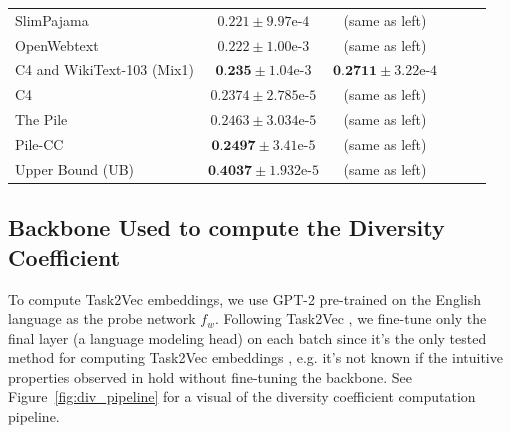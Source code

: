 \begin{table}[t]
\begin{center}
\begin{small}
\begin{sc}
\begin{tabular}{lccccr}
SlimPajama & $0.221 \pm 9.97\textrm{e-}4$ & (same as left) \\ %
OpenWebtext & $ 0.222 \pm  1.00\textrm{e-}3 $ & (same as left) \\ %

C4 and WikiText-103 (Mix1) & $ \textbf{0.235} \pm  1.04$\textrm{e-}3 & $\textbf{0.2711} \pm 3.22\textrm{e-}4$\\ %
C4 & $0.2374 \pm 2.785\textrm{e-}5$ & (same as left) \\

The Pile & $0.2463 \pm 3.034\textrm{e-}5$ & (same as left) \\
Pile-CC & $\textbf{0.2497} \pm 3.41\textrm{e-}5$ & (same as left) \\

Upper Bound (UB) & $\textbf{0.4037} \pm 1.932\textrm{e-}5$ & (same as left)\\
\bottomrule
\end{tabular}
\label{tab:div}
\end{sc}
\end{small}
\end{center}
\vskip -0.1in

\end{table}

\subsection{Backbone Used to compute the Diversity Coefficient}
To compute Task2Vec embeddings, we use GPT-2 \citep{gpt2} pre-trained on the English language as the probe network $f_w$.
Following Task2Vec \citep{task2vec}, we fine-tune only the final layer (a language modeling head) on each batch since it's the only tested method for computing Task2Vec embeddings \citep{task2vec, curse_low_div, miranda2023pretraining}, e.g. it's not known if the intuitive properties observed in \citep{task2vec} hold without fine-tuning the backbone.
See Figure~\ref{fig:div_pipeline} for a visual of the diversity coefficient computation pipeline.

